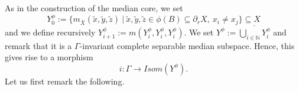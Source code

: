 \documentclass{amsart}
\numberwithin{equation}{section}
\newtheorem{prop}[thm]{Proposition}
\newcommand{\NN}{\mathbb{N}}      %
\theoremstyle{definition}
\def\bar{\overline}
\begin{document}



As in the construction of the median core, we set 
  \[
    Y_0^\phi:=\{m_{\bar X}(\tilde{x},\tilde{y},\tilde{z}) \ |\ \tilde{x},\tilde{y},\tilde{z}\in \phi(B)\subseteq \partial_r X, \ x_i\neq x_j\}\subseteq X
  \]
and we define recursively $Y_{i+1}^\phi:= m(Y_i^\phi,Y_i^\phi,Y_i^\phi)$. We set $Y^\phi:=\displaystyle{\overline{\bigcup_{i\in\NN}Y_i^\phi}}$ and remark that it is a $\Gamma$-invariant complete separable median subspace. Hence, this gives rise to a morphism 
\[
i:\Gamma\rightarrow Isom(Y^\phi).
\]
Let us first remark the following.
\end{document}
